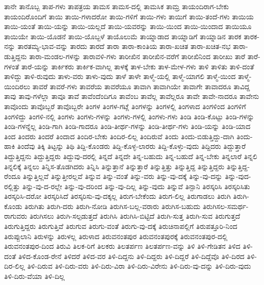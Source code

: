 {ತಾನೇ
ತಾನೊಬ್ಬ
ತಾಪ-ಗಳು
ತಾಪತ್ರಯ
ತಾಮಸ
ತಾಮಸ-ದಲ್ಲಿ
ತಾಮಸಿಕ
ತಾಮ್ರ
ತಾಯಂದಿರಾಗ-ಬೇಕು
ತಾಯಂದಿರೊಂದಿಗೆ
ತಾಯಿ
ತಾಯಿ-ಗಳಾದರೋ
ತಾಯಿ-ಗಳಿಗೆ
ತಾಯಿ-ಗಳು
ತಾಯಿಗೆ
ತಾಯಿ-ತಂದೆ-ಗಳು
ತಾಯಿಯ
ತಾಯಿ-ಯಂತೆ
ತಾಯಿ-ಯನ್ನು
ತಾಯಿ-ಯಲ್ಲದೆ
ತಾಯಿ-ಯವರನ್ನು
ತಾಯಿ-ಯಿಂದ
ತಾಯಿ-ಯಿಂದಾದ
ತಾಯಿಯೂ
ತಾಯಿಯೇ
ತಾಯಿ-ಯೊಡನೆ
ತಾಯಿ-ಯೊಬ್ಬಳೆ
ತಾಯೊಲುಮೆ
ತಾಯ್ನಾಡಾದ
ತಾಯ್ನಾಡಿಗೆ
ತಾಯ್ನಾಡಿನ
ತಾರಕ
ತಾರಕ-ನನ್ನು
ತಾರತಮ್ಯ-ಭಾವ-ವನ್ನು
ತಾರದು
ತಾರದೆ
ತಾರಾ
ತಾರಾ-ಕಾಂತಿಯ
ತಾರಾ-ಖಚಿತ
ತಾರಾ-ಖಚಿತ-ನಭ
ತಾರಾ-ಡುತ್ತಿದ್ದನು
ತಾರಾ-ಮಂಡಲ-ಗಳನ್ನು
ತಾರಾವಳಿ-ಗಳು
ತಾರೀಖಿನ
ತಾರೀಖಿನ-ವರೆಗೆ
ತಾರೀಖಿನಿಂದ
ತಾರೀಖು
ತಾರೆ
ತಾರೆ-ಗಳಂತೆ
ತಾರೆ-ಯನ್ನು
ತಾರ್ಕಿಕರು
ತಾರ್ಕಿಕ-ವಾಗಿಲ್ಲ
ತಾಳಕ್ಕೆ
ತಾಳ-ಬೇಕು
ತಾಳ-ಮೇಳ-ಗಳು
ತಾಳಿ
ತಾಳಿತು
ತಾಳಿ-ದಂತೆ
ತಾಳಿದ್ದು
ತಾಳಿ-ರುವುದು
ತಾಳು-ವರು
ತಾಳು-ವುದು
ತಾಳೆ
ತಾಳೇ
ತಾಳ್ಮೆ-ಯಲ್ಲಿ
ತಾಳ್ಮೆ-ಯಾಗಲಿ
ತಾಳ್ಮೆ-ಯಿಂದ
ತಾಳ್ಮೆ-ಯಿಂದಿರಲು
ತಾವರೆ
ತಾವರೆ-ಗಳು
ತಾವರೆಯ
ತಾವರೆಯೂ
ತಾವಾಗಿ
ತಾವಾಗಿಯೇ
ತಾವಾಗೇ
ತಾವಾದರೂ
ತಾವಿದ್ದ
ತಾವು
ತಾವು-ಗಳೆಲ್ಲಾ
ತಾವೂ
ತಾವೆ
ತಾವೆಂದೆಂದಿಗೂ
ತಾವೆಂಬ
ತಾವೆಲ್ಲ
ತಾವೆಲ್ಲರೂ
ತಾವೇ
ತಾವೇ-ನಾದರೂ
ತಾವೇನು
ತಾವೊಂದು
ತಾವೊಬ್ಬರೆ
ತಾವೊಬ್ಬರೇ
ತಿಂಗಳ
ತಿಂಗಳ-ಗಟ್ಲೆ
ತಿಂಗಳನ್ನು
ತಿಂಗಳಲ್ಲಿ
ತಿಂಗಳಾದ
ತಿಂಗಳಿಂದ
ತಿಂಗಳಿಗೆ
ತಿಂಗಳಿದ್ದು
ತಿಂಗಳಿ-ನಲ್ಲಿ
ತಿಂಗಳು
ತಿಂಗಳು-ಗಳನ್ನು
ತಿಂಗಳು-ಗಳಲ್ಲಿ
ತಿಂಗಳು-ಗಳು
ತಿಂಡಿ
ತಿಂಡಿ-ಕೊಟ್ಟು
ತಿಂಡಿ-ಗಳನ್ನು
ತಿಂಡಿ-ಗಳನ್ನೆಲ್ಲ
ತಿಂಡಿ-ಗಾಗಿ
ತಿಂಡಿ-ಗಾದರೂ
ತಿಂಡಿ-ತೀರ್ಥ-ಗಳನ್ನು
ತಿಂಡಿ-ತೀರ್ಥ-ಗಳು
ತಿಂಡಿ-ಯನ್ನು
ತಿಂಡಿ-ಯಾದ
ತಿಂದ
ತಿಂದರು
ತಿಂದರೆ
ತಿಂದಾದ
ತಿಂದಿರ-ಬೇಕು
ತಿಂದಿರ-ಲಿಲ್ಲ
ತಿಂದಿರುವೆ
ತಿಂದು
ತಿಂದು-ಬಿಡುತ್ತಿದ್ದು-ದಾಗಿ
ತಿಂದು-ಹಾಕಿ
ತಿಂದೆವು
ತಿಕ್ಕಿ
ತಿಟ್ಟನ್ನು
ತಿಥಿ
ತಿದ್ದಿ-ಕೊಂಡರು
ತಿದ್ದಿ-ಕೊಳ್ಳ-ಲಾರರು
ತಿದ್ದಿ-ಕೊಳ್ಳು-ವುದು
ತಿದ್ದಿದರು
ತಿದ್ದುತ್ತಾರೆ
ತಿದ್ದುತ್ತಿದ್ದನು
ತಿದ್ದುತ್ತಿದ್ದರು
ತಿದ್ದುವು-ದರಲ್ಲಿ
ತಿನ್ನದೆ
ತಿನ್ನದೇ
ತಿನ್ನ-ಬಹುದು
ತಿನ್ನ-ಬಹುದೆ
ತಿನ್ನ-ಬೇಕು
ತಿನ್ನಲಾರೆ
ತಿನ್ನಲಿ
ತಿನ್ನಲಿಕ್ಕೆ
ತಿನ್ನಲು
ತಿನ್ನಿಸ-ತೊಡಗಿದರು
ತಿನ್ನಿಸಿ
ತಿನ್ನುತ್ತಾನೆ
ತಿನ್ನುತ್ತಾರೆ
ತಿನ್ನುತ್ತಿತ್ತು
ತಿನ್ನುತ್ತಿದ್ದ
ತಿನ್ನುತ್ತಿದ್ದರು
ತಿನ್ನುತ್ತಿದ್ದ-ರೆಂದೂ
ತಿನ್ನುತ್ತಿಲ್ಲವೆ
ತಿನ್ನುತ್ತೀರಲ್ಲವೆ
ತಿನ್ನುವ
ತಿನ್ನು-ವಂತೆ
ತಿನ್ನು-ವರು
ತಿನ್ನು-ವು-ದಕ್ಕೆ
ತಿನ್ನು-ವು-ದನ್ನು
ತಿನ್ನು-ವುದ-ರಲ್ಲಿತ್ತು
ತಿನ್ನು-ವು-ದ-ರಲ್ಲೇ
ತಿನ್ನು-ವು-ದರಿಂದ
ತಿನ್ನು-ವು-ದಿಲ್ಲ
ತಿನ್ನು-ವುದು
ತಿನ್ನುವೆ
ತಿನ್ಪಾನಿ
ತಿರಸ್ಕರಿಸಿ
ತಿರಸ್ಕರಿಸಿತು
ತಿರಸ್ಕರಿಸಿ-ದರೋ
ತಿರಸ್ಕರಿಸಿದೆ
ತಿರಸ್ಕರಿಸು-ವು-ದಕ್ಕಲ್ಲ
ತಿರುಗ-ಬೇಕೆಂದು
ತಿರುಗ-ಲಿಲ್ಲ
ತಿರುಗಾಡಲು
ತಿರುಗಿ
ತಿರುಗಿ-ಕೊಂಡು
ತಿರುಗಿತು
ತಿರುಗಿ-ದರು
ತಿರುಗಿ-ನೋಡಿ
ತಿರುಗಿಸ-ಬಲ್ಲ-ವರಾರು
ತಿರುಗಿಸ-ಬಹುದು
ತಿರುಗಿಸಲ-ಸಮರ್ಥ-ರಾಗುವರು
ತಿರುಗಿಸಲು
ತಿರುಗಿ-ಸಲ್ಪಡುತ್ತದೆ
ತಿರುಗಿಸಿ
ತಿರುಗಿಸಿ-ಬಿಟ್ಟಿದೆ
ತಿರುಗಿ-ಸುತ್ತ
ತಿರುಗಿ-ಸುವ
ತಿರುಗುತ್ತದೆ
ತಿರುಗುತ್ತಿದ್ದರು
ತಿರುಗುತ್ತಿವೆ
ತಿರುಗುವ
ತಿರುಗು-ವಂತೆ
ತಿರುಗು-ವು-ದಕ್ಕೆ
ತಿರುಚಿನಾಪಲ್ಲಿಗೆ
ತಿರುಪತ್ತೂರಿ-ನಿಂದ
ತಿರುಪ್ಪುಲಾನಿ
ತಿರುಳನ್ನು
ತಿರುಳಲ್ಲ
ತಿರುಳಾದ
ತಿರುವನಂತಪುರ
ತಿರುವನಂತಪುರಕ್ಕೆ
ತಿರುವನಂತಪುರ-ದಲ್ಲಿ
ತಿರುವನಂತಪುರ-ದಿಂದ
ತಿರುವಿ
ತಿಲಕ-ರಿಗೆ
ತಿಲಕರು
ತಿಲತರ್ಪಣ
ತಿಲತರ್ಪಣ-ವನ್ನು
ತಿಳಿ
ತಿಳಿ-ಗೇಡಿತನ
ತಿಳಿದ
ತಿಳಿ-ದಂತೆ
ತಿಳಿದ-ಕೊಂಡ-ರೇನೆ
ತಿಳಿದರೆ
ತಿಳಿದ-ವರ
ತಿಳಿ-ದಿದ್ದನು
ತಿಳಿ-ದಿದ್ದರು
ತಿಳಿ-ದಿದ್ದರೆ
ತಿಳಿ-ದಿದ್ದೆವೊ
ತಿಳಿ-ದಿರದ
ತಿಳಿ-ದಿರ-ಲಿಲ್ಲ
ತಿಳಿ-ದಿರುವ
ತಿಳಿ-ದಿರು-ವರು
ತಿಳಿ-ದಿರು-ವಿರಾ
ತಿಳಿ-ದಿರು-ವಿರೇನು
ತಿಳಿ-ದಿರು-ವು-ದನ್ನು
ತಿಳಿ-ದಿರು-ವುದು
ತಿಳಿ-ದಿರು-ವೆಯಾ
ತಿಳಿ-ದಿಲ್ಲ
}
